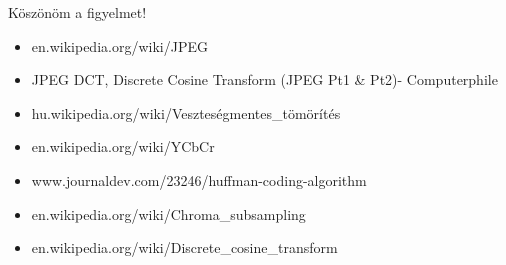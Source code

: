 \documentclass{beamer}
\begin{document}
\begin{frame}
\centering
{\Huge Köszönöm a figyelmet!}
\end{frame}

\begin{footnotesize}
    \begin{itemize}
        \item en.wikipedia.org/wiki/JPEG
        \item JPEG DCT, Discrete Cosine Transform (JPEG Pt1 \& Pt2)- Computerphile
        \item hu.wikipedia.org/wiki/Veszteségmentes\_tömörítés
        \item en.wikipedia.org/wiki/YCbCr
        \item www.journaldev.com/23246/huffman-coding-algorithm
        \item en.wikipedia.org/wiki/Chroma\_subsampling
        \item en.wikipedia.org/wiki/Discrete\_cosine\_transform
    \end{itemize}
\end{footnotesize}
\end{document}
